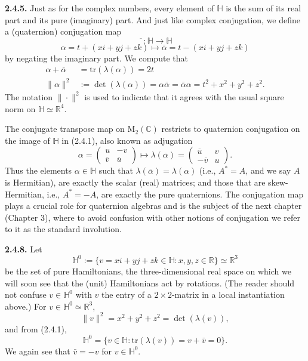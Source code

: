 \documentclass{article}
\theoremstyle{definition}
\begin{document}
\textbf{2.4.5.} Just as for the complex numbers, every element of $\mathbb{H}$ is the sum of its real part and its pure (imaginary) part. And just like complex conjugation, we define a (quaternion) conjugation map
$$\overline{\phantom{\alpha}} : \mathbb{H} \to \mathbb{H}$$
\begin{equation}
\alpha = t + (xi + yj + zk) \mapsto \overline{\alpha} = t - (xi + yj + zk) \tag{2.4.6}
\end{equation}
by negating the imaginary part. We compute that
\begin{equation}
\begin{aligned}
\alpha + \overline{\alpha} &= \mathrm{tr}(\lambda(\alpha)) = 2t \\
\|\alpha\|^2 &:= \det(\lambda(\alpha)) = \alpha\overline{\alpha} = \overline{\alpha}\alpha = t^2 + x^2 + y^2 + z^2.
\end{aligned} \tag{2.4.7}
\end{equation}
The notation $\|\cdot\|^2$ is used to indicate that it agrees with the usual square norm on $\mathbb{H} \simeq \mathbb{R}^4$.

The conjugate transpose map on $\mathrm{M}_2(\mathbb{C})$ restricts to quaternion conjugation on the image of $\mathbb{H}$ in (2.4.1), also known as adjugation
$$\alpha = \begin{pmatrix} u & -v \\ \overline{v} & \overline{u} \end{pmatrix} \mapsto \lambda(\overline{\alpha}) = \begin{pmatrix} \overline{u} & v \\ -\overline{v} & u \end{pmatrix}.$$
Thus the elements $\alpha \in \mathbb{H}$ such that $\lambda(\overline{\alpha}) = \lambda(\alpha)$ (i.e., $A^* = A$, and we say $A$ is Hermitian), are exactly the scalar (real) matrices; and those that are skew-Hermitian, i.e., $A^* = -A$, are exactly the pure quaternions. The conjugation map plays a crucial role for quaternion algebras and is the subject of the next chapter (Chapter 3), where to avoid confusion with other notions of conjugation we refer to it as the standard involution.

\textbf{2.4.8.} Let
$$\mathbb{H}^0 := \{v = xi + yj + zk \in \mathbb{H} : x, y, z \in \mathbb{R}\} \simeq \mathbb{R}^3$$
be the set of pure Hamiltonians, the three-dimensional real space on which we will soon see that the (unit) Hamiltonians act by rotations. (The reader should not confuse $v \in \mathbb{H}^0$ with $v$ the entry of a $2 \times 2$-matrix in a local instantiation above.) For $v \in \mathbb{H}^0 \simeq \mathbb{R}^3$,
\begin{equation}
\|v\|^2 = x^2 + y^2 + z^2 = \det(\lambda(v)), \tag{2.4.9}
\end{equation}
and from (2.4.1),
$$\mathbb{H}^0 = \{v \in \mathbb{H} : \mathrm{tr}(\lambda(v)) = v + \bar{v} = 0\}.$$
We again see that $\bar{v} = -v$ for $v \in \mathbb{H}^0$.
\end{document}
